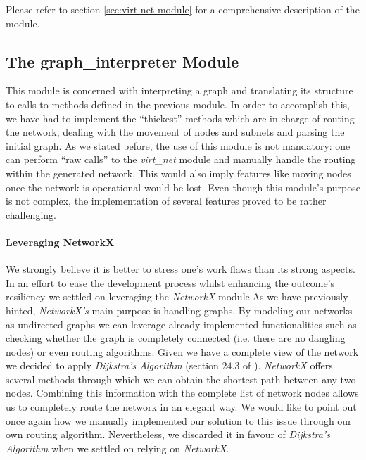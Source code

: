             Please refer to section \ref{sec:virt-net-module} for a comprehensive description of the module.\\

        \subsection{The graph\_interpreter Module}
            This module is concerned with interpreting a graph and translating its structure to calls to methods defined in the previous module. In order to accomplish this, we have had to implement the ``thickest'' methods which are in charge of routing the network, dealing with the movement of nodes and subnets and parsing the initial graph. As we stated before, the use of this module is not mandatory: one can perform ``raw calls'' to the \textit{virt\_net} module and manually handle the routing within the generated network. This would also imply features like moving nodes once the network is operational would be lost. Even though this module's purpose is not complex, the implementation of several features proved to be rather challenging.\\

            \paragraph{Leveraging NetworkX}
                We strongly believe it is better to stress one's work flaws than its strong aspects. In an effort to ease the development process whilst enhancing the outcome's resiliency we settled on leveraging the \textit{NetworkX} module.As we have previously hinted, \textit{NetworkX's} main purpose is handling graphs. By modeling our networks as undirected graphs we can leverage already implemented functionalities such as checking whether the graph is completely connected (i.e. there are no dangling nodes) or even routing algorithms. Given we have a complete view of the network we decided to apply \textit{Dijkstra's Algorithm} (section $24.3$ of \cite{bib:dijkstra-alg}). \textit{NetworkX} offers several methods through which we can obtain the shortest path between any two nodes. Combining this information with the complete list of network nodes allows us to completely route the network in an elegant way. We would like to point out once again how we manually implemented our solution to this issue through our own routing algorithm. Nevertheless, we discarded it in favour of \textit{Dijkstra's Algorithm} when we settled on relying on \textit{NetworkX}.\\

